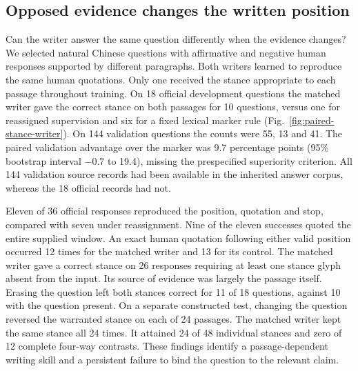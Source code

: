 \subsection*{Opposed evidence changes the written position}
Can the writer answer the same question differently when the evidence changes? We selected natural Chinese questions with affirmative and negative human responses supported by different paragraphs. Both writers learned to reproduce the same human quotations. Only one received the stance appropriate to each passage throughout training. On 18 official development questions the matched writer gave the correct stance on both passages for 10 questions, versus one for reassigned supervision and six for a fixed lexical marker rule (Fig.~\ref{fig:paired-stance-writer}). On 144 validation questions the counts were 55, 13 and 41. The paired validation advantage over the marker was 9.7 percentage points (95\% bootstrap interval $-0.7$ to 19.4), missing the prespecified superiority criterion. All 144 validation source records had been available in the inherited answer corpus, whereas the 18 official records had not.

Eleven of 36 official responses reproduced the position, quotation and stop, compared with seven under reassignment. Nine of the eleven successes quoted the entire supplied window. An exact human quotation following either valid position occurred 12 times for the matched writer and 13 for its control. The matched writer gave a correct stance on 26 responses requiring at least one stance glyph absent from the input. Its source of evidence was largely the passage itself. Erasing the question left both stances correct for 11 of 18 questions, against 10 with the question present. On a separate constructed test, changing the question reversed the warranted stance on each of 24 passages. The matched writer kept the same stance all 24 times. It attained 24 of 48 individual stances and zero of 12 complete four-way contrasts. These findings identify a passage-dependent writing skill and a persistent failure to bind the question to the relevant claim.
